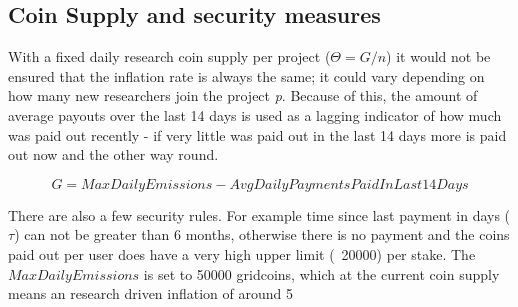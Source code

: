 \subsection{Coin Supply and security measures}

With a fixed daily research coin supply per project ($\Theta = G/n$) it would not be ensured that the inflation rate is always the same; it could vary depending on how many new researchers join the project \textit{p}. Because of this, the amount of average payouts over the last 14 days is used as a lagging indicator of how much was paid out recently - if very little was paid out in the last 14 days more is paid out now and the other way round.

\[ G = MaxDailyEmissions - AvgDailyPaymentsPaidInLast14Days \]

There are also a few security rules. For example time since last payment in days ($\tau$) can not be greater than 6 months, otherwise there is no payment and the coins paid out per user does have a very high upper limit (~20000) per stake.
The $MaxDailyEmissions$ is set to 50000 gridcoins, which at the current coin supply means an research driven inflation of around 5%
